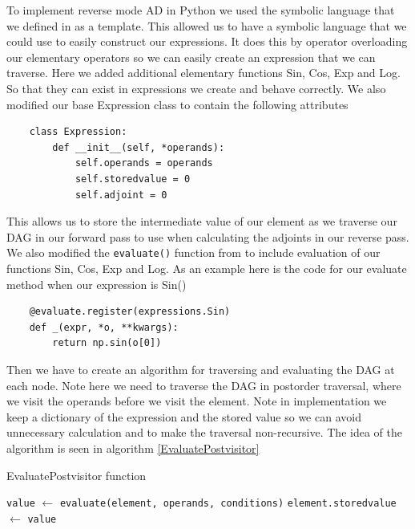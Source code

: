 \documentclass{article}
\begin{document}
To implement reverse mode AD in Python we used the symbolic language that we defined in \cite{PoPBook} as a template. This allowed us to have a symbolic language that we could use to easily construct our expressions. It does this by operator overloading our elementary operators so we can easily create an expression that we can traverse. Here we added additional elementary functions Sin, Cos, Exp and Log. So that they can exist in expressions we create and behave correctly. We also modified our base Expression class to contain the following attributes
\begin{verbatim}
    class Expression:
        def __init__(self, *operands):
            self.operands = operands
            self.storedvalue = 0
            self.adjoint = 0
\end{verbatim}
This allows us to store the intermediate value of our element as we traverse our DAG in our forward pass to use when calculating the adjoints in our reverse pass.
We also modified the \verb|evaluate()| function from \cite{PoPBook} to include evaluation of our functions Sin, Cos, Exp and Log. As an example here is the code for our evaluate method when our expression is Sin()
\begin{verbatim}
    @evaluate.register(expressions.Sin)
    def _(expr, *o, **kwargs):
        return np.sin(o[0])
\end{verbatim}

Then we have to create an algorithm for traversing and evaluating the DAG at each node. Note here we need to traverse the DAG in postorder traversal, where we visit the operands before we visit the element. Note in implementation we keep a dictionary of the expression and the stored value so we can avoid unnecessary calculation and to make the traversal non-recursive. The idea of the algorithm is seen in algorithm \ref{EvaluatePostvisitor}

\begin{algorithm}[h!]
\caption{EvaluatePostvisitor function}\label{EvaluatePostvisitor}
\begin{algorithmic}[1]
\State \verb|value| $\gets$ \verb|evaluate(element, operands, conditions)|
\State \verb|element.storedvalue| $\gets$ \verb|value|
\EndFor
\EndProcedure
\end{algorithmic}
\end{algorithm}
\end{document}
